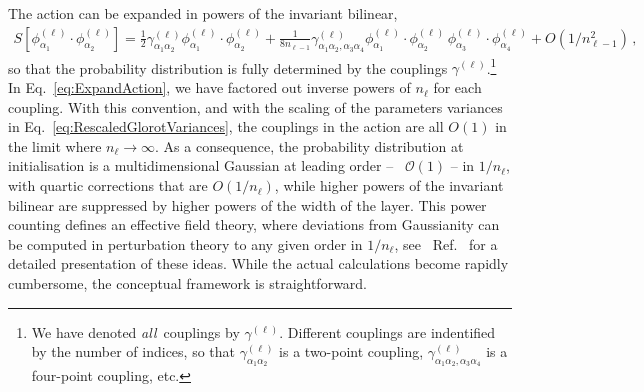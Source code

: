 The action can be expanded in powers of the invariant bilinear,
\begin{align}
    \label{eq:ExpandAction}
    S\left[\phi^{(\ell)}_{\alpha_1}
            \cdot \phi^{(\ell)}_{\alpha_2}\right] =
        \frac12 \gamma^{(\ell)}_{\alpha_1\alpha_2}
            \phi^{(\ell)}_{\alpha_1} \cdot \phi^{(\ell)}_{\alpha_2} +
            \frac{1}{8 n_{\ell-1}} \gamma^{(\ell)}_{\alpha_1\alpha_2,\alpha_3\alpha_4}
            \phi^{(\ell)}_{\alpha_1} \cdot \phi^{(\ell)}_{\alpha_2} \,
            \phi^{(\ell)}_{\alpha_3} \cdot \phi^{(\ell)}_{\alpha_4} + O(1/n_{\ell-1}^2)\, ,
\end{align}
so that the probability distribution is fully determined by the couplings 
$\gamma^{(\ell)}$.\footnote{
    We have denoted {\em all}\ couplings by $\gamma^{{(\ell)}}$. Different couplings 
    are indentified by the number of indices, so that $\gamma^{(\ell)}_{\alpha_1\alpha_2}$ 
    is a two-point coupling, $\gamma^{(\ell)}_{\alpha_1\alpha_2,\alpha_3\alpha_4}$ is a four-point 
    coupling, etc. 
} 
In
Eq.~\eqref{eq:ExpandAction}, we have factored out inverse powers of $n_\ell$ for each coupling.
With this convention, and with the scaling of the parameters variances in
Eq.~\eqref{eq:RescaledGlorotVariances}, the couplings in the action are all $O(1)$
in the limit where $n_\ell\to\infty$.
As a consequence, the probability distribution at initialisation is a multidimensional Gaussian at
leading order -- \ie\ $\mathcal{O}(1)$ -- in $1/n_\ell$, with quartic corrections that are $O(1/n_\ell)$, while higher powers
of the invariant bilinear are suppressed by higher powers of the width of the layer. This power counting
defines an effective field theory, where deviations from Gaussianity can be computed in perturbation
theory to any given order in $1/n_\ell$, see \eg\ Ref.~\cite{Roberts:2021fes} for a detailed
presentation of these ideas. While the actual calculations become rapidly cumbersome, the
conceptual framework is straightforward.

